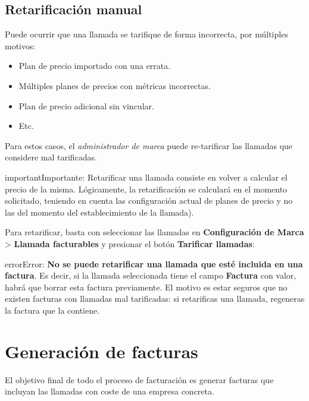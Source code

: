 \documentclass[letterpaper,10pt,spanish]{sphinxmanual}
\begin{document}
\subsection{Retarificación manual}
\label{billing_and_invoices/bill_a_call:manual-re-billing}
Puede ocurrir que una llamada se tarifique de forma incorrecta, por múltiples motivos:
\begin{itemize}
\item {} 
Plan de precio importado con una errata.

\item {} 
Múltiples planes de precios con métricas incorrectas.

\item {} 
Plan de precio adicional sin vincular.

\item {} 
Etc.

\end{itemize}

Para estos casos, el \emph{administrador de marca} puede re-tarificar las llamadas que considere mal tarificadas.

\begin{notice}{important}{Importante:}
Retarificar una llamada consiste en volver a calcular el precio de la misma. Lógicamente, la retarificación se calculará en el momento solicitado, teniendo en cuenta las configuración actual de planes de precio y no las del momento del establecimiento de la llamada).
\end{notice}

Para retarificar, basta con seleccionar las llamadas en \textbf{Configuración de Marca} \textgreater{} \textbf{Llamada facturables} y presionar el botón \textbf{Tarificar llamadas}:

\noindent{}

\begin{notice}{error}{Error:}
\textbf{No se puede retarificar una llamada que esté incluida en una factura}. Es decir, si la llamada seleccionada tiene el campo \textbf{Factura} con valor, habrá que borrar esta factura previamente. El motivo es estar seguros que no existen facturas con llamadas mal tarificadas: si retarificas una llamada, regeneras la factura que la contiene.
\end{notice}


\section{Generación de facturas}
\label{billing_and_invoices/invoices:invoices}\label{billing_and_invoices/invoices::doc}\label{billing_and_invoices/invoices:invoice-generation}
El objetivo final de todo el proceso de facturación es generar facturas que incluyan las llamadas con coste de una empresa concreta.
\end{document}
